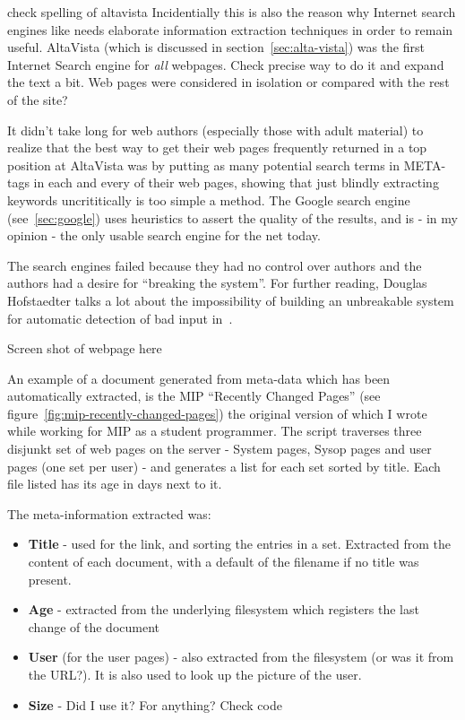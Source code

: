 \begin{center}
\end{center}



\textsf{check spelling of altavista}
Incidentially this is also the reason why Internet search engines like
needs elaborate information extraction techniques in order
to remain useful.  AltaVista (which is discussed in
section~\vref{sec:alta-vista}) was the first Internet Search engine
for \textit{all} webpages. \textsf{Check precise way to do it and
  expand the text a bit.  Web pages were considered in isolation or
  compared with the rest of the site?}

It didn't take long for web authors (especially those with adult
material) to realize that the best way to get their web pages
frequently returned in a top position at AltaVista was by putting as
many potential search terms in META-tags in each and every of their
web pages, showing that just blindly extracting keywords
\textsf{uncrititically} is too simple a method.  The Google search
engine (see~\vref{sec:google}) uses \textsf{heuristics} to assert the
quality of the results, and is - in my opinion - the only usable
search engine for the net today.

The search engines failed because they had no control over authors and
the authors had a desire for ``breaking the system''.  For further
reading, Douglas Hofstaedter talks a lot about the impossibility of
building an unbreakable system for automatic detection of bad input
in~\cite{goedelescherbach}.


\textsf{Screen shot of webpage here}

An example of a document generated from meta-data which has been
automatically extracted, is the MIP ``Recently Changed Pages'' (see
figure~\vref{fig:mip-recently-changed-pages}) the original version of
which I wrote while working for MIP as a student programmer.  The
script traverses three disjunkt set of web pages on the server -
System pages, Sysop pages and user pages (one set per user) - and
generates a list for each set sorted by title.  Each file listed has
its age in days next to it.

The meta-information extracted was:

\begin{itemize}
\item \textbf{Title} - used for the link, and sorting the entries in a
  set.  Extracted from the content of each document, with a default of
  the filename if no title was present.
\item \textbf{Age} - extracted from the underlying filesystem which
  registers the last change of the document
\item \textbf{User} (for the user pages) - also extracted from the
  filesystem (\textsf{or was it from the URL?}).  It is also used to
  look up the picture of the user.
\item \textbf{Size} - \textsf{Did I use it?  For anything?  Check code}
\end{itemize}

